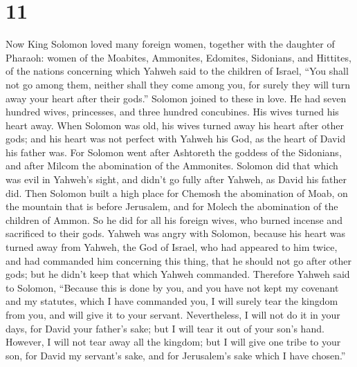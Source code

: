 \hypertarget{section-10}{%
\section{11}\label{section-10}}

 Now King Solomon loved many foreign women, together with
the daughter of Pharaoh: women of the Moabites, Ammonites, Edomites,
Sidonians, and Hittites,  of the nations concerning which
Yahweh said to the children of Israel, ``You shall not go among them,
neither shall they come among you, for surely they will turn away your
heart after their gods.'' Solomon joined to these in love.
 He had seven hundred wives, princesses, and three hundred
concubines. His wives turned his heart away.  When Solomon
was old, his wives turned away his heart after other gods; and his heart
was not perfect with Yahweh his God, as the heart of David his father
was.  For Solomon went after Ashtoreth the goddess of the
Sidonians, and after Milcom the abomination of the Ammonites.
 Solomon did that which was evil in Yahweh's sight, and
didn't go fully after Yahweh, as David his father did. 
Then Solomon built a high place for Chemosh the abomination of Moab, on
the mountain that is before Jerusalem, and for Molech the abomination of
the children of Ammon.  So he did for all his foreign
wives, who burned incense and sacrificed to their gods. 
Yahweh was angry with Solomon, because his heart was turned away from
Yahweh, the God of Israel, who had appeared to him twice,
 and had commanded him concerning this thing, that he
should not go after other gods; but he didn't keep that which Yahweh
commanded.  Therefore Yahweh said to Solomon, ``Because
this is done by you, and you have not kept my covenant and my statutes,
which I have commanded you, I will surely tear the kingdom from you, and
will give it to your servant.  Nevertheless, I will not
do it in your days, for David your father's sake; but I will tear it out
of your son's hand.  However, I will not tear away all
the kingdom; but I will give one tribe to your son, for David my
servant's sake, and for Jerusalem's sake which I have chosen.''


